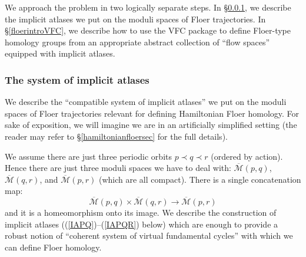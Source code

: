 \documentclass[12pt]{article}
\theoremstyle{definition}
\theoremstyle{remark}
\numberwithin{equation}{subsection}
\newcommand{\Mbar}{\overline{\mathcal M}}
\begin{document}
We approach the problem in two logically separate steps.  In \S\ref{floerintroIA}, we describe the implicit atlases we put on the moduli spaces of Floer trajectories.  In \S\ref{floerintroVFC}, we describe how to use the VFC package to define Floer-type homology groups from an appropriate abstract collection of ``flow spaces'' equipped with implicit atlases.

\subsubsection{The system of implicit atlases}\label{floerintroIA}

We describe the ``compatible system of implicit atlases'' we put on the moduli spaces of Floer trajectories relevant for defining Hamiltonian Floer homology.  For sake of exposition, we will imagine we are in an artificially simplified setting (the reader may refer to \S\ref{hamiltonianfloersec} for the full details).

We assume there are just three periodic orbits $p\prec q\prec r$ (ordered by action).  Hence there are just three moduli spaces we have to deal with: $\Mbar(p,q)$, $\Mbar(q,r)$, and $\Mbar(p,r)$ (which are all compact).  There is a single concatenation map:
\begin{equation}\label{concatintro}
\Mbar(p,q)\times\Mbar(q,r)\to\Mbar(p,r)
\end{equation}
and it is a homeomorphism onto its image.  We describe the construction of implicit atlases ((\ref{IAPQ})--(\ref{IAPQR}) below) which are enough to provide a robust notion of ``coherent system of virtual fundamental cycles'' with which we can define Floer homology.
\end{document}
